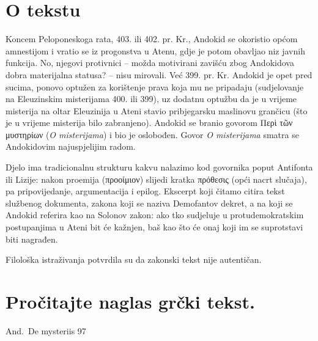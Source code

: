 \section*{O tekstu}

Koncem Peloponeskoga rata, 403. ili 402. pr. Kr., Andokid se okoristio općom amnestijom i vratio se iz progonstva u Atenu, gdje je potom obavljao niz javnih funkcija. No, njegovi protivnici – možda motivirani zavišću zbog Andokidova dobra materijalna statusa? – nisu mirovali. Već 399. pr. Kr. Andokid je opet pred sucima, ponovo optužen za korištenje prava koja mu ne pripadaju (sudjelovanje na Eleuzinskim misterijama 400. ili 399), uz dodatnu optužbu da je u vrijeme misterija na oltar Eleuzinija u Ateni stavio pribjegarsku maslinovu grančicu (što je u vrijeme misterija bilo zabranjeno). Andokid se branio govorom \textgreek[variant=ancient]{Περὶ τῶν μυστηρίων} (\textit{O misterijama}) i bio je oslobođen. Govor \textit{O misterijama} smatra se Andokidovim najuspjelijim radom.

Djelo ima tradicionalnu strukturu kakvu nalazimo kod govornika poput Antifonta ili Lizije: nakon proemija \textgreek[variant=ancient]{(προοίμιον)} slijedi kratka \textgreek[variant=ancient]{πρόθεσις} (opći nacrt slučaja), pa pripovijedanje, argumentacija i epilog. Ekscerpt koji čitamo citira tekst službenog dokumenta, zakona koji se naziva Demofantov dekret, a na koji se Andokid referira kao na Solonov zakon: ako tko sudjeluje u protudemokratskim postupanjima u Ateni bit će kažnjen, baš kao što će onaj koji im se suprotstavi biti nagrađen.

Filološka istraživanja potvrdila su da zakonski tekst nije autentičan.



\newpage

\section*{Pročitajte naglas grčki tekst.}

And.\ De mysteriis 97


\medskip


